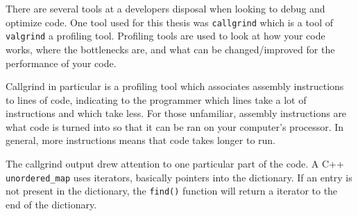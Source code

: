 \documentclass[12pt,twoside]{reedthesis}
\begin{document}
There are several tools at a developers disposal when looking to debug and optimize code. One tool used for this thesis was \texttt{callgrind} which is a tool of \texttt{valgrind} a profiling tool. Profiling tools are used to look at how your code works, where the bottlenecks are, and what can be changed/improved for the performance of your code.

Callgrind in particular is a profiling tool which associates assembly instructions to lines of code, indicating to the programmer which lines take a lot of instructions and which take less. For those unfamiliar, assembly instructions are what code is turned into so that it can be ran on your computer's processor. In general, more instructions means that code takes longer to run.

The callgrind output drew attention to one particular part of the code. A C++ \texttt{unordered\_map} uses iterators, basically pointers into the dictionary. If an entry is not present in the dictionary, the \texttt{find()} function will return a iterator to the end of the dictionary.
\end{document}
